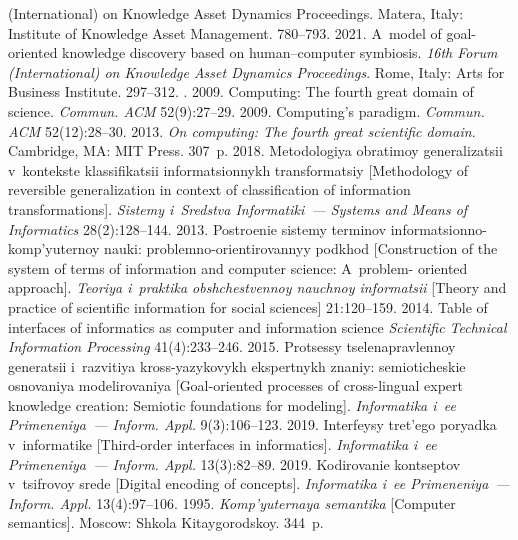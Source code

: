 \begin{multicols}{2}
{{\begin{thebibliography}{99}
{(International) on Knowledge Asset Dynamics Proceedings}. Matera, Italy: Institute of Knowledge Asset 
Management. 780--793.
 2021. A~model of goal-oriented knowledge discovery based on human--computer 
symbiosis. \textit{16th Forum (International) on Knowledge Asset Dynamics Proceedings}. Rome, 
Italy: Arts for Business Institute. 297--312.
. 2009. Computing: The fourth great domain of science. 
\textit{Commun. ACM} 52(9):27--29.
 2009. Computing's paradigm. \textit{Commun. ACM} 52(12):28--30.
 2013. \textit{On computing: The fourth great scientific domain}. 
Cambridge, MA: MIT Press. 307~p.
 2018. Metodologiya obratimoy generalizatsii v~kontekste klassifikatsii 
informatsionnykh trans\-for\-ma\-tsiy [Methodology of reversible generalization in context of classification 
of information transformations]. \textit{Sistemy i~Sredstva Informatiki~--- Systems and Means of 
Informatics} 28(2):128--144.
 2013. Postroenie sistemy terminov informatsionno-komp'yuternoy nauki: 
problemno-orientirovannyy podkhod [Construction of the system of terms of information and 
computer science: A~problem- oriented approach]. \textit{Teoriya i~praktika obshchestvennoy 
nauchnoy informatsii} [Theory and practice of scientific information for social sciences] 
21:120--159.
 2014. 
Table of interfaces of informatics as computer and information science
\textit{Scientific Technical Information Processing} 41(4):233--246.
 2015. Protsessy tselenapravlennoy generatsii i~razvitiya kross-yazykovykh 
ekspertnykh znaniy: semioticheskie osnovaniya modelirovaniya [Goal-oriented processes of  
cross-lingual expert knowledge creation: Semiotic foundations for modeling]. \textit{Informatika i~ee 
Primeneniya~--- Inform. Appl.} 9(3):106--123.
 2019. Interfeysy tret'ego poryadka v~informatike [Third-order interfaces in 
informatics]. \textit{Informatika i~ee Primeneniya~--- Inform. Appl.} 13(3):82--89.
 2019. Kodirovanie kontseptov v~tsifrovoy srede [Digital encoding of 
concepts]. \textit{Informatika i~ee Primeneniya~--- Inform. Appl.} 13(4):97--106.
 1995. \textit{Komp'yu\-ter\-naya semantika} [Computer 
semantics]. Moscow: Shkola Kitaygorodskoy. 344~p.

\end{thebibliography}}}
\end{multicols}
